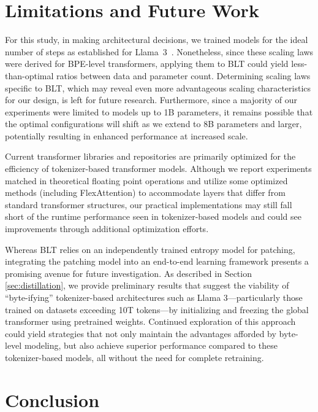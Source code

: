 \section{Limitations and Future Work}

For this study, in making architectural decisions, we trained models for the ideal number of steps as established for Llama~3~\citep{dubey2024llama}. Nonetheless, since these scaling laws were derived for BPE-level transformers, applying them to {\textsc BLT} could yield less-than-optimal ratios between data and parameter count. Determining scaling laws specific to {\textsc BLT}, which may reveal even more advantageous scaling characteristics for our design, is left for future research. Furthermore, since a majority of our experiments were limited to models up to 1B parameters, it remains possible that the optimal configurations will shift as we extend to 8B parameters and larger, potentially resulting in enhanced performance at increased scale.

Current transformer libraries and repositories are primarily optimized for the efficiency of tokenizer-based transformer models. Although we report experiments matched in theoretical floating point operations and utilize some optimized methods (including FlexAttention) to accommodate layers that differ from standard transformer structures, our practical implementations may still fall short of the runtime performance seen in tokenizer-based models and could see improvements through additional optimization efforts.

Whereas {\textsc BLT} relies on an independently trained entropy model for patching, integrating the patching model into an end-to-end learning framework presents a promising avenue for future investigation. As described in Section \ref{sec:distillation}, we provide preliminary results that suggest the viability of ``byte-ifying'' tokenizer-based architectures such as Llama 3—particularly those trained on datasets exceeding 10T tokens—by initializing and freezing the global transformer using pretrained weights. Continued exploration of this approach could yield strategies that not only maintain the advantages afforded by byte-level modeling, but also achieve superior performance compared to these tokenizer-based models, all without the need for complete retraining.

\section{Conclusion}
\label{section:conclusion}

